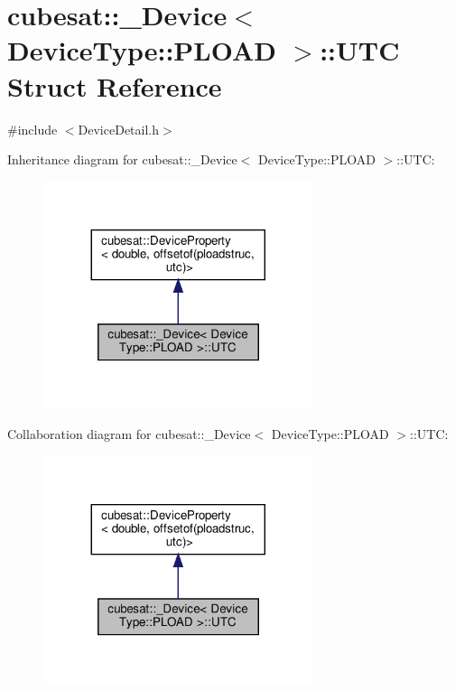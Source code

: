 \hypertarget{structcubesat_1_1__Device_3_01DeviceType_1_1PLOAD_01_4_1_1UTC}{}\section{cubesat\+:\+:\+\_\+\+Device$<$ Device\+Type\+:\+:P\+L\+O\+AD $>$\+:\+:U\+TC Struct Reference}
\label{structcubesat_1_1__Device_3_01DeviceType_1_1PLOAD_01_4_1_1UTC}


{\ttfamily \#include $<$Device\+Detail.\+h$>$}



Inheritance diagram for cubesat\+:\+:\+\_\+\+Device$<$ Device\+Type\+:\+:P\+L\+O\+AD $>$\+:\+:U\+TC\+:\nopagebreak
\begin{figure}[H]
\begin{center}
\leavevmode
\includegraphics[width=224pt]{structcubesat_1_1__Device_3_01DeviceType_1_1PLOAD_01_4_1_1UTC__inherit__graph}
\end{center}
\end{figure}


Collaboration diagram for cubesat\+:\+:\+\_\+\+Device$<$ Device\+Type\+:\+:P\+L\+O\+AD $>$\+:\+:U\+TC\+:\nopagebreak
\begin{figure}[H]
\begin{center}
\leavevmode
\includegraphics[width=224pt]{structcubesat_1_1__Device_3_01DeviceType_1_1PLOAD_01_4_1_1UTC__coll__graph}
\end{center}
\end{figure}
